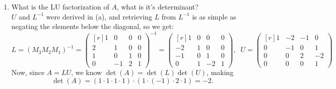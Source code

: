 \documentclass[11pt]{article}
\newcommand{\n}{\vspace{0.3cm}}
\begin{document}
\begin{enumerate}
\begin{enumerate}
		      \item What is the LU factorization of \(A\), what is it's determinant? \n\\
		            \(U\) and \(L^{-1}\) were derived in (a), and retrieving \(L\) from \(L^{-1}\) is as simple as negating the elements below the diagonal, so we get:
		            \[
			            L = (M_3 M_2 M_1)^{-1}
			            =
			            \begin{pmatrix*}[r]
				            1 & 0  & 0 & 0 \\
				            2 & 1  & 0 & 0 \\
				            1 & 0  & 1 & 0 \\
				            0 & -1 & 2 & 1
			            \end{pmatrix*}^{-1}
			            =
			            \begin{pmatrix*}[r]
				            1  & 0 & 0  & 0 \\
				            -2 & 1 & 0  & 0 \\
				            -1 & 0 & 1  & 0 \\
				            0  & 1 & -2 & 1
			            \end{pmatrix*}, \;\;
			            U =
			            \begin{pmatrix*}[r]
				            1 & -2 & -1 & 0  \\
				            0 & -1 & 0  & 1  \\
				            0 & 0  & 2  & -2 \\
				            0 & 0  & 0  & 1
			            \end{pmatrix*}
		            \]
		            Now, since \(A = LU\), we know \(\det(A) = \det(L)\det(U)\), making \[\det(A) = (1 \cdot 1 \cdot 1 \cdot 1) \cdot (1 \cdot (-1) \cdot 2 \cdot 1) = -2.\]


\end{enumerate}
\end{enumerate}
\end{document}
